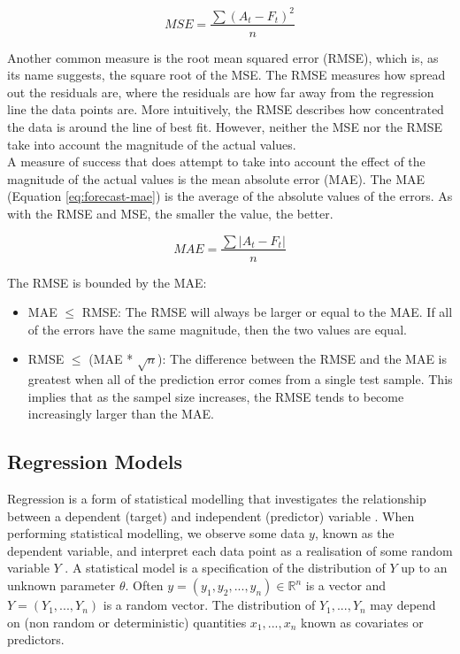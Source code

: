 \begin{equation}
\label{eq:forecast-mse}
    MSE = \frac{\sum(A_t-F_t)^2}{n}
\end{equation}

Another common measure is the root mean squared error (RMSE), which is, as its name suggests, the square root of the MSE. The RMSE measures how spread out the residuals are, where the residuals are how far away from the regression line the data points are. More intuitively, the RMSE describes how concentrated the data is around the line of best fit. However, neither the MSE nor the RMSE take into account the magnitude of the actual values. \\

A measure of success that does attempt to take into account the effect of the magnitude of the actual values is the mean absolute error (MAE). The MAE (Equation \ref{eq:forecast-mae}) is the average of the absolute values of the errors. As with the RMSE and MSE, the smaller the value, the better.

\begin{equation}
\label{eq:forecast-mae}
    MAE = \frac{\sum|A_t-F_t|}{n}
\end{equation}

The RMSE is bounded by the MAE:

\begin{itemize}
    \item MAE $\leq$ RMSE: The RMSE will always be larger or equal to the MAE. If all of the errors have the same magnitude, then the two values are equal.
    \item RMSE $\leq$ (MAE * $\sqrt{n}$): The difference between the RMSE and the MAE is greatest when all of the prediction error comes from a single test sample. This implies that as the sampel size increases, the RMSE tends to become increasingly larger than the MAE. 
\end{itemize}

\subsection{Regression Models}
\label{section:regression-models-research}

Regression is a form of statistical modelling that investigates the relationship between a dependent (target) and independent (predictor) variable \cite{regression-techniques}. When performing statistical modelling, we observe some data $y$, known as the dependent variable, and interpret each data point as a realisation of some random variable $Y$ \cite{m2s2-notes}. A statistical model is a specification of the distribution of $Y$ up to an unknown parameter $\theta$. Often $y = (y_1, y_2, ..., y_n) \in \mathbb{R} ^ n$ is a vector and $Y = (Y_1, ..., Y_n)$ is a random vector. The distribution of $Y_1, ..., Y_n$ may depend on (non random or deterministic) quantities $x_1, ..., x_n$ known as covariates or predictors. \\

